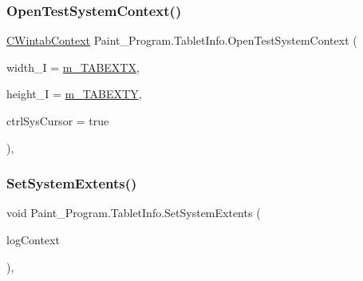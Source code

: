\mbox{\label{class_paint___program_1_1_tablet_info_ab02b5950a6b9f9c29104a2d68d2ba26b}} 
\subsubsection{\texorpdfstring{Open\+Test\+System\+Context()}{OpenTestSystemContext()}}
{\footnotesize\ttfamily \mbox{\hyperlink{class_wintab_d_n_1_1_c_wintab_context}{C\+Wintab\+Context}} Paint\+\_\+\+Program.\+Tablet\+Info.\+Open\+Test\+System\+Context (\begin{DoxyParamCaption}\item[{int}]{width\+\_\+I = {\ttfamily \mbox{\hyperlink{class_paint___program_1_1_tablet_info_aec96087301274b16e37ad97d9d86f2a8}{m\+\_\+\+T\+A\+B\+E\+X\+TX}}},  }\item[{int}]{height\+\_\+I = {\ttfamily \mbox{\hyperlink{class_paint___program_1_1_tablet_info_a694255f1b42334dcd3c05f6ff9b0ff6d}{m\+\_\+\+T\+A\+B\+E\+X\+TY}}},  }\item[{bool}]{ctrl\+Sys\+Cursor = {\ttfamily true} }\end{DoxyParamCaption})\hspace{0.3cm}{\ttfamily [inline]}, {\ttfamily [private]}}

\mbox{\label{class_paint___program_1_1_tablet_info_aa34192cb8b5aad8e9741543b8cafb217}} 
\subsubsection{\texorpdfstring{Set\+System\+Extents()}{SetSystemExtents()}}
{\footnotesize\ttfamily void Paint\+\_\+\+Program.\+Tablet\+Info.\+Set\+System\+Extents (\begin{DoxyParamCaption}\item[{ref \mbox{\hyperlink{class_wintab_d_n_1_1_c_wintab_context}{C\+Wintab\+Context}}}]{log\+Context }\end{DoxyParamCaption})\hspace{0.3cm}{\ttfamily [inline]}, {\ttfamily [private]}}

